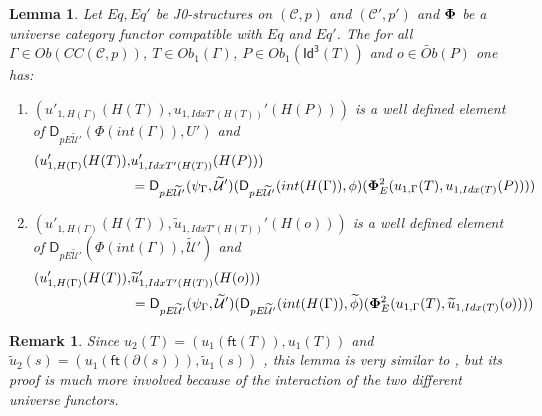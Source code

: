 \documentclass[12pt]{article}
\numberwithin{equation}{section}
\newtheorem{lemma}[proposition]{Lemma}
\newtheorem{remark}[proposition]{Remark}
\newcommand{\llabel}[1]{\label{#1}}
\newcommand{\wt}{\widetilde}
\newcommand{\toCC}{CC} %
\newcommand{\ft}{\mathsf{ft}}
\newcommand{\Idx}{\mathsf{Id^3}} %
\newcommand{\U}{\mathcal{U}}
\newcommand{\D}{\mathsf{D}}
\begin{document}
\begin{lemma}
\llabel{2015.05.06.l3} Let $Eq, Eq'$ be J0-structures on $({\mathcal C},p)$ and
$({\mathcal C}',p')$ and $\bf\Phi$ be a universe category functor compatible
with $Eq$ and $Eq'$. The for all $\Gamma\in Ob(\toCC({\mathcal C},p))$, $T\in
Ob_1(\Gamma)$, $P\in Ob_1(\Idx(T))$ and $o\in \wt{Ob}(P)$ one has:
%
\begin{enumerate}
\item $(u'_{1,H(\Gamma)}(H(T)), u_{1,IdxT'(H(T))}'(H(P)))$ is a well defined
  element of $\D_{pE\wt{\U}'}(\Phi(int(\Gamma)),U')$ and
%
  \begin{align*}
    (u'_{1,H(\Gamma)}(H(T)), & u_{1,IdxT'(H(T))}'(H(P))) \\
    & = \D_{pE\wt{\U}'}(\psi_{\Gamma},\wt{\U}')(\D_{pE\wt{\U}'}(int(H(\Gamma)),\phi)({\bf\Phi}_{E}^2(u_{1,\Gamma}(T),u_{1,Idx(T)}(P))))
  \end{align*}
\item $(u'_{1,H(\Gamma)}(H(T)), \wt{u}_{1,IdxT'(H(T))}'(H(o)))$ is a well
  defined element of $\D_{pE\wt{\U}'}(\Phi(int(\Gamma)),\wt{\U}')$ and
%
  \begin{align*}
    (u'_{1,H(\Gamma)}(H(T)), & \wt{u}_{1,IdxT'(H(T))}'(H(o))) \\
    & = \D_{pE\wt{\U}'}(\psi_{\Gamma},\wt{\U}')(\D_{pE\wt{\U}'}(int(H(\Gamma)),\wt{\phi})({\bf\Phi}_{E}^2(u_{1,\Gamma}(T),\wt{u}_{1,Idx(T)}(o))))
  \end{align*}
\end{enumerate}
\end{lemma}
%
\begin{remark}\rm
Since $u_2(T)=(u_1(\ft(T)),u_1(T))$ and
$\wt{u}_2(s)=(u_1(\ft(\partial(s))),\wt{u}_1(s))$ , this lemma is very similar
to \cite[Lemma 6.1(3,4)]{fromunivwithPi}, but its proof is much more involved
because of the interaction of the two different universe functors.
\end{remark}
%
\end{document}
